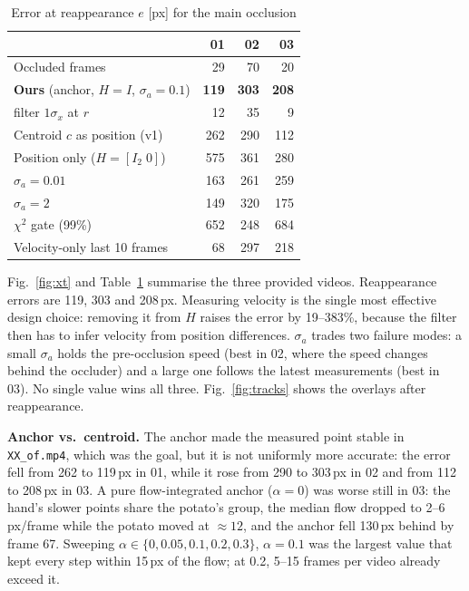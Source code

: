 \documentclass[conference]{assets/latex/IEEEtran}
\begin{document}
\begin{table}[t]
\caption{Error at reappearance $e$ [px] for the main occlusion}
\begin{center}
\begin{tabular}{lrrr}
\hline
 & 01 & 02 & 03 \\
\hline
Occluded frames & 29 & 70 & 20 \\
\textbf{Ours} (anchor, $H{=}I$, $\sigma_a{=}0.1$) & \textbf{119} & \textbf{303} & \textbf{208} \\
\quad filter $1\sigma_x$ at $r$ & 12 & 35 & 9 \\
Centroid $c$ as position (v1) & 262 & 290 & 112 \\
Position only ($H{=}[I_2\;0]$) & 575 & 361 & 280 \\
$\sigma_a=0.01$ & 163 & 261 & 259 \\
$\sigma_a=2$ & 149 & 320 & 175 \\
$\chi^2$ gate (99\%) & 652 & 248 & 684 \\
Velocity-only last 10 frames & 68 & 297 & 218 \\
\hline
\end{tabular}
\label{tab:err}
\end{center}
\end{table}

Fig.~\ref{fig:xt} and Table~\ref{tab:err} summarise the three provided videos. Reappearance errors are 119, 303 and 208\,px. Measuring velocity is the single most effective design choice: removing it from $H$ raises the error by 19--383\%, because the filter then has to infer velocity from position differences. $\sigma_a$ trades two failure modes: a small $\sigma_a$ holds the pre-occlusion speed (best in 02, where the speed changes behind the occluder) and a large one follows the latest measurements (best in 03). No single value wins all three. Fig.~\ref{fig:tracks} shows the overlays after reappearance.

\textbf{Anchor vs.\ centroid.} The anchor made the measured point stable in \texttt{XX\_of.mp4}, which was the goal, but it is not uniformly more accurate: the error fell from 262 to 119\,px in 01, while it rose from 290 to 303\,px in 02 and from 112 to 208\,px in 03. A pure flow-integrated anchor ($\alpha=0$) was worse still in 03: the hand's slower points share the potato's group, the median flow dropped to 2--6\,px/frame while the potato moved at ${\approx}12$, and the anchor fell 130\,px behind by frame 67. Sweeping $\alpha\in\{0,0.05,0.1,0.2,0.3\}$, $\alpha=0.1$ was the largest value that kept every step within 15\,px of the flow; at 0.2, 5--15 frames per video already exceed it.
\end{document}
